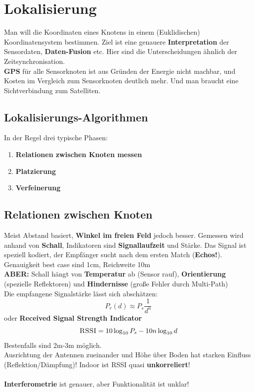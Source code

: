 \documentclass[a4paper]{article}
\begin{document}
\newpage
\section{Lokalisierung}
Man will die Koordinaten eines Knotens in einem (Euklidischen) Koordinatensystem bestimmen. Ziel ist eine genauere \textbf{Interpretation} der Sensordaten, \textbf{Daten-Fusion} etc. Hier sind die Unterscheidungen ähnlich der Zeitsynchronisation. \\

\textbf{GPS} für alle Sensorknoten ist aus Gründen der Energie nicht machbar, und Kosten im Vergleich zum Sensorknoten deutlich mehr. Und man braucht eine Sichtverbindung zum Satelliten.
\subsection{Lokalisierungs-Algorithmen}
In der Regel drei typische Phasen:
\begin{enumerate}
	\item \textbf{Relationen zwischen Knoten messen} 
	\item \textbf{Platzierung}
	\item \textbf{Verfeinerung}
\end{enumerate}
\subsection{Relationen zwischen Knoten}
Meist Abstand basiert, \textbf{Winkel im freien Feld} jedoch besser. Gemessen wird anhand von \textbf{Schall}, Indikatoren sind \textbf{Signallaufzeit} und Stärke. Das Signal ist speziell kodiert, der Empfänger sucht nach dem ersten Match (\textbf{Echos!}). Genauigkeit best case sind 1cm, Reichweite 10m\\

\textbf{ABER:} Schall hängt von \textbf{Temperatur} ab (Sensor rauf), \textbf{Orientierung} (spezielle Reflektoren) und \textbf{Hindernisse} (große Fehler durch Multi-Path)\\

Die empfangene Signalstärke lässt sich abschätzen:
$$P_r(d)\approx P_s \dfrac{1}{d^n}$$
oder \textbf{Received Signal Strength Indicator}
$$\textsc{RSSI} = 10 \log_{10} P_s - 10n\log_{10}d$$
Bestenfalls sind 2m-3m möglich.\\

Ausrichtung der Antennen zueinander und Höhe über Boden hat starken Einfluss (Reflektion/Dämpfung)! Indoor ist RSSI quasi \textbf{unkorreliert}!\\
\\
\textbf{Interferometrie} ist genauer, aber Funktionalität ist unklar!  
\end{document}
